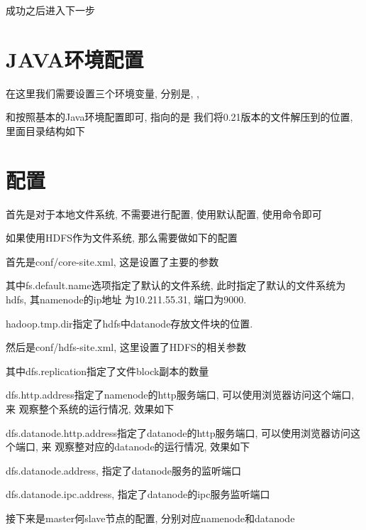 成功之后进入下一步

\section{JAVA环境配置}

在这里我们需要设置三个环境变量, 分别是{\JH}, {\CPATH}, {\HHOME}


{\JH}和{\CPATH}按照基本的Java环境配置即可, {\HHOME}指向的是
我们将{\Hadoop}0.21版本的文件解压到的位置, 里面目录结构如下


\section{{\Hadoop}配置}

首先是对于本地文件系统, {\Hadoop}不需要进行配置, 使用默认配置,
使用命令即可



如果使用HDFS作为文件系统, 那么需要做如下的配置

首先是conf/core-site.xml, 这是设置了{\Hadoop}主要的参数


其中fs.default.name选项指定了默认的文件系统,
此时指定了默认的文件系统为hdfs, 其namenode的ip地址
为10.211.55.31, 端口为9000.

hadoop.tmp.dir指定了hdfs中datanode存放文件块的位置.

然后是conf/hdfs-site.xml, 这里设置了HDFS的相关参数


其中dfs.replication指定了文件block副本的数量

dfs.http.address指定了namenode的http服务端口, 可以使用浏览器访问这个端口, 来
观察整个系统的运行情况, 效果如下


dfs.datanode.http.address指定了datanode的http服务端口, 可以使用浏览器访问这个端口, 来
观察整对应的datanode的运行情况, 效果如下


dfs.datanode.address, 指定了datanode服务的监听端口

dfs.datanode.ipc.address, 指定了datanode的ipc服务监听端口

接下来是master何slave节点的配置, 分别对应namenode和datanode

